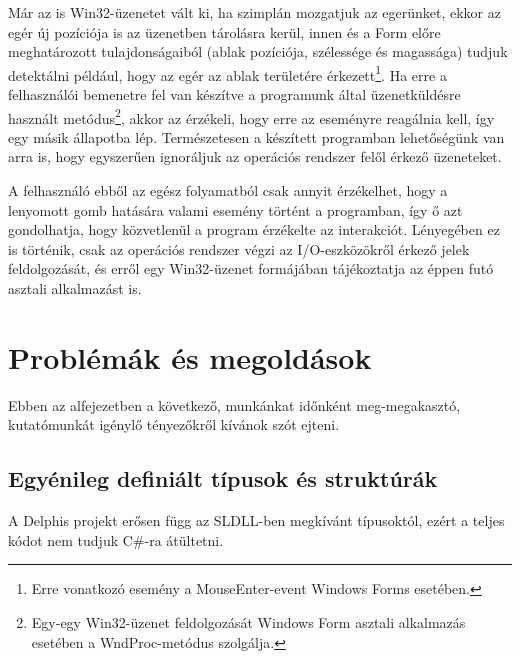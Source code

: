 \documentclass[tocnopagenum]{thesis-ekf}
\theoremstyle{definition}
\theoremstyle{remark}
\begin{document}
	Már az is Win32-üzenetet vált ki, ha szimplán mozgatjuk az egerünket, ekkor az egér új pozíciója is az üzenetben tárolásra kerül, innen és a Form előre meghatározott tulajdonságaiból (ablak pozíciója, szélessége és magassága) tudjuk detektálni például, hogy az egér az ablak területére érkezett\footnote{Erre vonatkozó esemény a MouseEnter-event Windows Forms esetében.}.
	Ha erre a felhasználói bemenetre fel van készítve a programunk által üzenetküldésre használt metódus\footnote{Egy-egy Win32-üzenet feldolgozását Windows Form asztali alkalmazás esetében a WndProc-metódus szolgálja.}, akkor az érzékeli, hogy erre az eseményre reagálnia kell, így egy másik állapotba lép. Természetesen a készített programban lehetőségünk van arra is, hogy egyszerűen ignoráljuk az operációs rendszer felől érkező üzeneteket.
	
	A felhasználó ebből az egész folyamatból csak annyit érzékelhet, hogy a lenyomott gomb hatására valami esemény történt a programban, így ő azt gondolhatja, hogy közvetlenül a program érzékelte az interakciót. Lényegében ez is történik, csak az operációs rendszer végzi az I/O-eszközökről érkező jelek feldolgozását, és erről egy Win32-üzenet formájában tájékoztatja az éppen futó asztali alkalmazást is.
	\section{Problémák és megoldások}
	Ebben az alfejezetben a következő, munkánkat időnként meg-megakasztó, kutatómunkát igénylő tényezőkről kívánok szót ejteni.
	\subsection{Egyénileg definiált típusok és struktúrák}
	A Delphis projekt erősen függ az SLDLL-ben megkívánt típusoktól, ezért a teljes kódot nem tudjuk C\#-ra átültetni.
\end{document}
